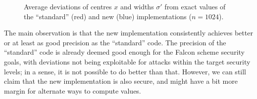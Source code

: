 \documentclass{llncs}
\begin{document}
\begin{figure}
    \hspace{0.04\textwidth}
    \caption{\label{fig:deviations-1024}Average deviations of centres
    $x$ and widths $\sigma'$ from exact values of the ``standard'' (red)
    and new (blue) implementations ($n = 1024$).}
\end{figure}

The main observation is that the new implementation consistently
achieves better or at least as good precision as the ``standard'' code.
The precision of the ``standard'' code is already deemed good enough for
the Falcon scheme security goals, with deviations not being exploitable
for attacks within the target security levels; in a sense, it is not
possible to do better than that. However, we can still claim that the
new implementation is also secure, and might have a bit more margin for
alternate ways to compute values.
\end{document}
